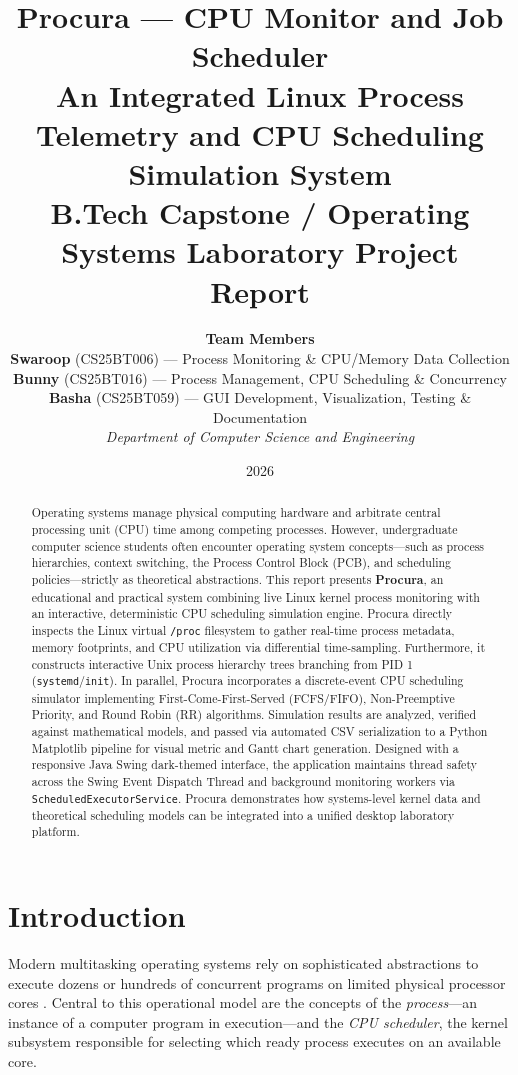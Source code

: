 \documentclass[12pt,a4paper]{article}
\title{\textbf{Procura — CPU Monitor and Job Scheduler}\\[0.5em]
\large An Integrated Linux Process Telemetry and CPU Scheduling Simulation System\\[0.2em]
\normalsize B.Tech Capstone / Operating Systems Laboratory Project Report}
\author{
  \textbf{Team Members}\\[0.3em]
  \textbf{Swaroop} (CS25BT006) — Process Monitoring \& CPU/Memory Data Collection\\
  \textbf{Bunny} (CS25BT016) — Process Management, CPU Scheduling \& Concurrency\\
  \textbf{Basha} (CS25BT059) — GUI Development, Visualization, Testing \& Documentation\\[0.5em]
  \textit{Department of Computer Science and Engineering}
}
\date{2026}
\begin{document}
\maketitle

\begin{abstract}
Operating systems manage physical computing hardware and arbitrate central processing unit (CPU) time among competing processes. However, undergraduate computer science students often encounter operating system concepts—such as process hierarchies, context switching, the Process Control Block (PCB), and scheduling policies—strictly as theoretical abstractions. This report presents \textbf{Procura}, an educational and practical system combining live Linux kernel process monitoring with an interactive, deterministic CPU scheduling simulation engine. Procura directly inspects the Linux virtual \texttt{/proc} filesystem to gather real-time process metadata, memory footprints, and CPU utilization via differential time-sampling. Furthermore, it constructs interactive Unix process hierarchy trees branching from PID 1 (\texttt{systemd}/\texttt{init}). In parallel, Procura incorporates a discrete-event CPU scheduling simulator implementing First-Come-First-Served (FCFS/FIFO), Non-Preemptive Priority, and Round Robin (RR) algorithms. Simulation results are analyzed, verified against mathematical models, and passed via automated CSV serialization to a Python Matplotlib pipeline for visual metric and Gantt chart generation. Designed with a responsive Java Swing dark-themed interface, the application maintains thread safety across the Swing Event Dispatch Thread and background monitoring workers via \texttt{ScheduledExecutorService}. Procura demonstrates how systems-level kernel data and theoretical scheduling models can be integrated into a unified desktop laboratory platform.
\end{abstract}

\newpage
\tableofcontents
\newpage

\section{Introduction}
Modern multitasking operating systems rely on sophisticated abstractions to execute dozens or hundreds of concurrent programs on limited physical processor cores \cite{silberschatz2018operating, tanenbaum2014modern}. Central to this operational model are the concepts of the \textit{process}—an instance of a computer program in execution—and the \textit{CPU scheduler}, the kernel subsystem responsible for selecting which ready process executes on an available core.
\end{document}
